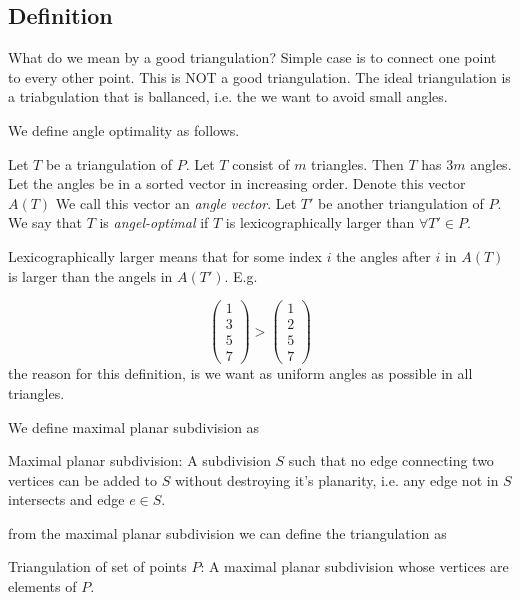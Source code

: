 \documentclass[10pt]{article}
\begin{document}
\subsection{Definition} %
\label{sub:definition}

What do we mean by a good triangulation?
Simple case is to connect one point to every other point. This is NOT a good triangulation. The ideal triangulation is a triabgulation that is ballanced, i.e. the we want to avoid small angles. 

We define angle optimality as follows.

Let $T$ be a triangulation of $P$. Let $T$ consist of $m$ triangles. Then $T$ has $3m$ angles. Let the angles be in a sorted vector in increasing order. Denote this vector $A(T)$ We call this vector an \emph{angle vector}. Let $T'$ be another triangulation of $P$. We say that $T$ is \emph{angel-optimal} if $T$ is lexicographically larger than $\forall T'\in P$.

Lexicographically larger means that for some index $i$ the angles after $i$ in $A(T)$ is larger than the angels in $A(T')$. E.g.

\begin{equation} 
\left(
\begin{array}{r} 
   1  \\
   3 \\
   5 \\
   7 
\end{array} 
\right) >   
\left(
\begin{array}{r} 
   1  \\
   2 \\
   5 \\
   7 
\end{array} 
\right)
\end{equation} 
the reason for this definition, is we want as uniform angles as possible in all triangles.


We define maximal planar subdivision as
\begin{definition}
Maximal planar subdivision: A subdivision $S$ such that no edge connecting two vertices can be added to $S$ without destroying it's planarity, i.e. any edge not in $S$ intersects and edge $e \in S$.  
\end{definition}
from the maximal planar subdivision we can define the triangulation as
\begin{definition}
Triangulation of set of points $P$: A maximal planar subdivision whose vertices are elements of $P$.  
\end{definition}
\end{document}

